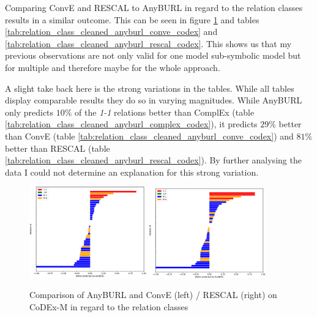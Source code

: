 Comparing ConvE and RESCAL to AnyBURL in regard to the relation classes results in a similar outcome. This can be seen in figure \ref{fig:relation_class_anyburl_conve_rescal_codex} and tables \ref{tab:relation_class_cleaned_anyburl_conve_codex} and \ref{tab:relation_class_cleaned_anyburl_rescal_codex}. This shows us that my previous observations are not only valid for one model sub-symbolic model but for multiple and therefore maybe for the whole approach.

A slight take back here is the strong variations in the tables. While all tables display comparable results they do so in varying magnitudes. While AnyBURL only predicts $10\%$ of the \textit{1-1} relations better than ComplEx (table \ref{tab:relation_class_cleaned_anyburl_complex_codex}), it predicts $29\%$ better than ConvE (table \ref{tab:relation_class_cleaned_anyburl_conve_codex}) and $81\%$ better than RESCAL (table \ref{tab:relation_class_cleaned_anyburl_rescal_codex}). By further analysing the data I could not determine an explanation for this strong variation.

\begin{figure}[H]
\centering
\includegraphics[width=0.45\textwidth]{images/relation_class_anyburl_conve_codex.PNG}
\includegraphics[width=0.45\textwidth]{images/relation_class_anyburl_rescal_codex.PNG}
\caption{Comparison of AnyBURL and ConvE (left) / RESCAL (right) on CoDEx-M in regard to the relation classes}
\label{fig:relation_class_anyburl_conve_rescal_codex}
\end{figure}


